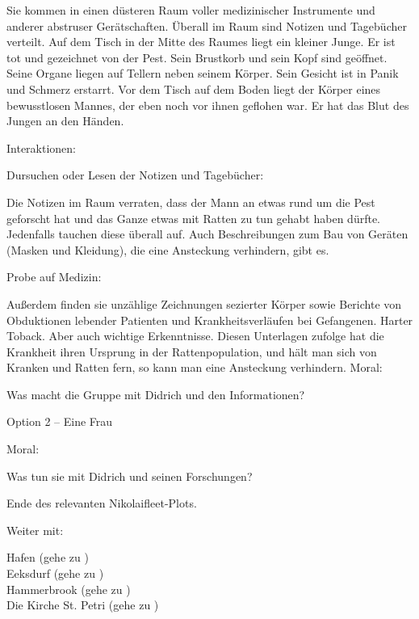 Sie kommen in einen düsteren Raum voller medizinischer Instrumente und anderer abstruser Gerätschaften. Überall im Raum sind Notizen und Tagebücher verteilt. Auf dem Tisch in der Mitte des Raumes liegt ein kleiner Junge. Er ist tot und gezeichnet von der Pest. Sein Brustkorb und sein Kopf sind geöffnet. Seine Organe liegen auf Tellern neben seinem Körper. Sein Gesicht ist in Panik und Schmerz erstarrt. Vor dem Tisch auf dem Boden liegt der Körper eines bewusstlosen Mannes, der eben noch vor ihnen geflohen war. Er hat das Blut des Jungen an den Händen.

Interaktionen:

Dursuchen oder Lesen der Notizen und Tagebücher:

Die Notizen im Raum verraten, dass der Mann an etwas rund um die Pest geforscht hat und das Ganze etwas mit Ratten zu tun gehabt haben dürfte. Jedenfalls tauchen diese überall auf. Auch Beschreibungen zum Bau von Geräten (Masken und Kleidung), die eine Ansteckung verhindern, gibt es.

Probe auf Medizin:

Außerdem finden sie unzählige Zeichnungen sezierter Körper sowie Berichte von Obduktionen lebender Patienten und Krankheitsverläufen bei Gefangenen. Harter Toback. Aber auch wichtige Erkenntnisse. Diesen Unterlagen zufolge hat die Krankheit ihren Ursprung in der Rattenpopulation, und hält man sich von Kranken und Ratten fern, so kann man eine Ansteckung verhindern.
Moral:

Was macht die Gruppe mit Didrich und den Informationen?

Option 2 – Eine Frau



Moral:

Was tun sie mit Didrich und seinen Forschungen?

Ende des relevanten Nikolaifleet-Plots.

Weiter mit:

Hafen (gehe zu \blue{\ref{Hafen}}) \\
Eeksdurf (gehe zu \blue{\ref{xd}}) \\
Hammerbrook (gehe zu \blue{\ref{arm}}) \\
Die Kirche St. Petri (gehe zu \blue{\ref{Petri}}) \\
